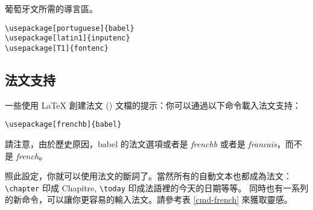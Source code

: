 \begin{table}[btp]
\caption{葡萄牙文所需的導言區。} \label{portuguese}
\begin{lined}{5cm}
\begin{verbatim}
\usepackage[portuguese]{babel}
\usepackage[latin1]{inputenc}
\usepackage[T1]{fontenc}
\end{verbatim}
\end{lined}
\end{table}


\subsection{法文支持}
一些使用 \LaTeX{} 創建法文 () 文檔的提示：你可以通過以下命令載入法文支持：
\begin{lscommand}
\verb|\usepackage[frenchb]{babel}|
\end{lscommand}

請注意，由於歷史原因，\textsf{babel} 的法文選項或者是 \emph{frenchb} 或者是 \emph{francais}，而不是 \emph{french}。

照此設定，你就可以使用法文的斷詞了。當然所有的自動文本也都成為法文：
\verb+\chapter+ 印成 Chapitre, \verb+\today+ 印成法語裡的今天的日期等等。
同時也有一系列的新命令，可以讓你更容易的輸入法文。請參考表 \ref{cmd-french} 來獲取靈感。

